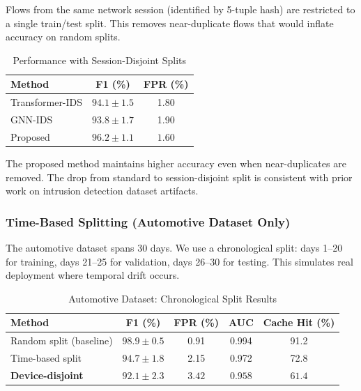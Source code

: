 \documentclass[preprint,12pt]{elsarticle}
\begin{document}
Flows from the same network session (identified by 5-tuple hash) are restricted to a single train/test split. This removes near-duplicate flows that would inflate accuracy on random splits.

\begin{table}[!t]
\caption{Performance with Session-Disjoint Splits}
\label{tab:session_disj}
\centering
\small
\begin{tabular}{@{}lcc@{}}
\toprule
\textbf{Method} & \textbf{F1 (\%)} & \textbf{FPR (\%)} \\
\midrule
Transformer-IDS & $94.1 \pm 1.5$ & 1.80 \\
GNN-IDS & $93.8 \pm 1.7$ & 1.90 \\
Proposed & $\mathbf{96.2} \pm 1.1$ & $\mathbf{1.60}$ \\
\bottomrule
\end{tabular}
\end{table}

The proposed method maintains higher accuracy even when near-duplicates are removed. The drop from standard to session-disjoint split is consistent with prior work on intrusion detection dataset artifacts.

\subsubsection{Time-Based Splitting (Automotive Dataset Only)}

The automotive dataset spans 30 days. We use a chronological split: days 1--20 for training, days 21--25 for validation, days 26--30 for testing. This simulates real deployment where temporal drift occurs.

\begin{table}[!t]
\caption{Automotive Dataset: Chronological Split Results}
\label{tab:time_split}
\centering
\small
\begin{tabular}{@{}lcccc@{}}
\toprule
\textbf{Method} & \textbf{F1 (\%)} & \textbf{FPR (\%)} & \textbf{AUC} & \textbf{Cache Hit (\%)} \\
\midrule
Random split (baseline) & $98.9 \pm 0.5$ & 0.91 & 0.994 & 91.2 \\
Time-based split & $94.7 \pm 1.8$ & 2.15 & 0.972 & 72.8 \\
\textbf{Device-disjoint} & $\mathbf{92.1} \pm 2.3$ & $\mathbf{3.42}$ & $\mathbf{0.958}$ & $\mathbf{61.4}$ \\
\bottomrule
\end{tabular}
\end{table}
\end{document}
